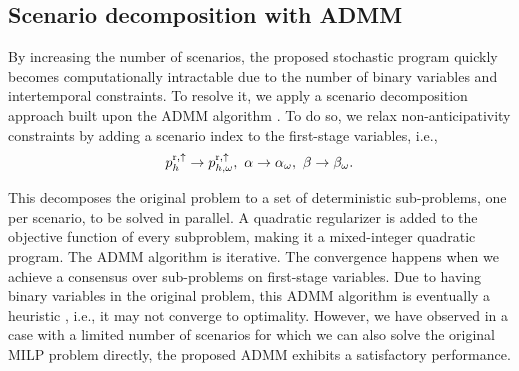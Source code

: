 \vspace{-1mm}
\subsection{Scenario decomposition with ADMM}
By increasing the number of scenarios,  the proposed stochastic program  quickly becomes computationally intractable due to the number of binary variables and intertemporal constraints. To resolve it, we apply a scenario decomposition approach built upon the ADMM algorithm \cite{boyd2011distributed}. To do so, we relax non-anticipativity constraints by adding a scenario index to the first-stage variables, i.e.,
%
\begin{equation}\label{eq:non_anticipativity}
    p_{h}^{\rm{r},\uparrow} \rightarrow p^{\rm{r},\uparrow}_{h,\omega}, \ \alpha \rightarrow \alpha_{\omega}, \ \beta \rightarrow \beta_{\omega}.
\end{equation}

This decomposes the original problem to a set of deterministic sub-problems, one per scenario, to be solved in parallel. A quadratic regularizer is added to the objective function of every subproblem, making it a mixed-integer quadratic program.  
The ADMM algorithm is iterative. The convergence happens when we achieve a consensus over sub-problems on first-stage  variables. Due to having binary variables in the original problem, this ADMM algorithm is eventually a heuristic \cite{hong2016convergence}, i.e., it may not converge to optimality. However, we have observed in a case with a limited number of scenarios for which we can also solve the original MILP problem directly, the proposed ADMM exhibits a satisfactory performance.
